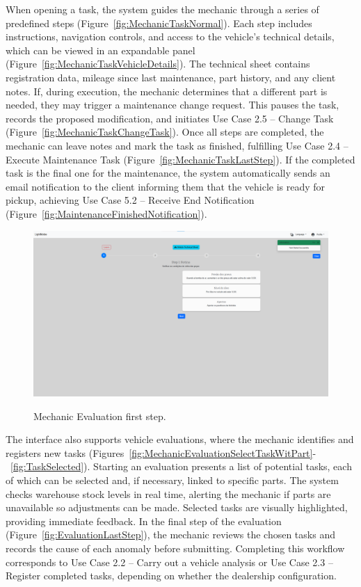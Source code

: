 When opening a task, the system guides the mechanic through a series of predefined steps (Figure~\ref{fig:MechanicTaskNormal}). Each step includes instructions, navigation controls, and access to the vehicle's technical details, which can be viewed in an expandable panel (Figure~\ref{fig:MechanicTaskVehicleDetails}). The technical sheet contains registration data, mileage since last maintenance, part history, and any client notes. If, during execution, the mechanic determines that a different part is needed, they may trigger a maintenance change request. This pauses the task, records the proposed modification, and initiates Use Case 2.5 – Change Task (Figure~\ref{fig:MechanicTaskChangeTask}). Once all steps are completed, the mechanic can leave notes and mark the task as finished, fulfilling Use Case 2.4 – Execute Maintenance Task (Figure~\ref{fig:MechanicTaskLastStep}). If the completed task is the final one for the maintenance, the system automatically sends an email notification to the client informing them that the vehicle is ready for pickup, achieving Use Case 5.2 – Receive End Notification (Figure~\ref{fig:MaintenanceFinishedNotification}).




\begin{figure}[h]
  \caption{Mechanic Evaluation first step.}
  \centering
  \includegraphics[width=\textwidth]{figs/Implementation/mechanic/MechanicEvaluationNormal}
  \label{fig:MechanicEvaluationNormal}
\end{figure}





The interface also supports vehicle evaluations, where the mechanic identifies and registers new tasks (Figures~\ref{fig:MechanicEvaluationSelectTaskWitPart}-~\ref{fig:TaskSelected}). Starting an evaluation presents a list of potential tasks, each of which can be selected and, if necessary, linked to specific parts. The system checks warehouse stock levels in real time, alerting the mechanic if parts are unavailable so adjustments can be made. Selected tasks are visually highlighted, providing immediate feedback. In the final step of the evaluation (Figure~\ref{fig:EvaluationLastStep}), the mechanic reviews the chosen tasks and records the cause of each anomaly before submitting. Completing this workflow corresponds to Use Case 2.2 – Carry out a vehicle analysis or Use Case 2.3 – Register completed tasks, depending on whether the dealership configuration.


